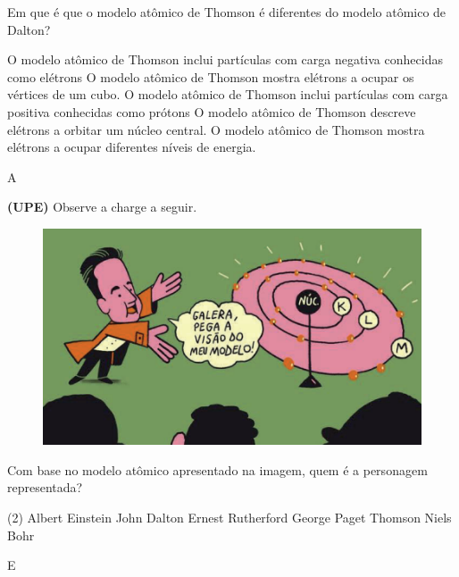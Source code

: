 \documentclass[9 pt]{scrartcl}
\def\PQ{0.84} %
\begin{document}
\begin{exercise}[points=\PQ]
Em que é que o modelo atômico de Thomson é diferentes do modelo atômico de Dalton?

\begin{choice}
\choice O modelo atômico de Thomson inclui partículas com carga negativa conhecidas como elétrons
\choice O modelo atômico de Thomson mostra elétrons a ocupar os vértices de um cubo.
\choice O modelo atômico de Thomson inclui partículas com carga positiva conhecidas como prótons
\choice O modelo atômico de Thomson descreve elétrons a orbitar um núcleo central.
\choice O modelo atômico de Thomson mostra elétrons a ocupar diferentes níveis de energia.
\end{choice}
\end{exercise}
\begin{solution}
A
\end{solution}






\begin{exercise}[points=\PQ]
\textbf{(UPE)} Observe a charge a seguir.

\begin{figure}[htbp]
\centering
\includegraphics[width=.9\linewidth]{Quimica_Geral/TeoriaAtomica/charge.png}
\caption{}
\end{figure}

Com base no modelo atômico apresentado na imagem, quem é a personagem representada?

\begin{choice}(2)
\choice Albert Einstein
\choice John Dalton
\choice Ernest Rutherford
\choice George Paget Thomson
\choice Niels Bohr
\end{choice}
\end{exercise}
\begin{solution}
E
\end{solution}
\end{document}
